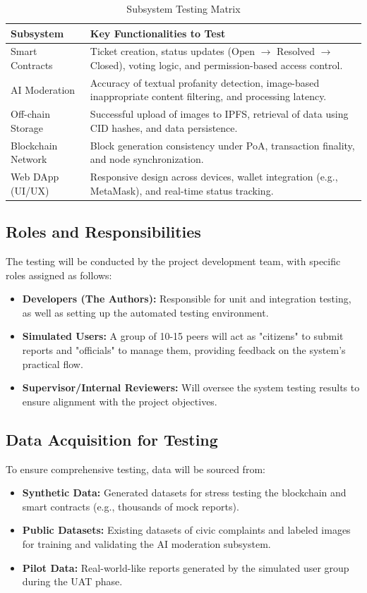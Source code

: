 \begin{table}[h!]
\centering
\caption{Subsystem Testing Matrix}
\begin{tabular}{|l|p{10cm}|}
\hline
\textbf{Subsystem} & \textbf{Key Functionalities to Test} \\ \hline
Smart Contracts & Ticket creation, status updates (Open $\rightarrow$ Resolved $\rightarrow$ Closed), voting logic, and permission-based access control. \\ \hline
AI Moderation & Accuracy of textual profanity detection, image-based inappropriate content filtering, and processing latency. \\ \hline
Off-chain Storage & Successful upload of images to IPFS, retrieval of data using CID hashes, and data persistence. \\ \hline
Blockchain Network & Block generation consistency under PoA, transaction finality, and node synchronization. \\ \hline
Web DApp (UI/UX) & Responsive design across devices, wallet integration (e.g., MetaMask), and real-time status tracking. \\ \hline
\end{tabular}
\end{table}

\subsection{Roles and Responsibilities}
The testing will be conducted by the project development team, with specific roles assigned as follows:
\begin{itemize}
    \item \textbf{Developers (The Authors):} Responsible for unit and integration testing, as well as setting up the automated testing environment.
    \item \textbf{Simulated Users:} A group of 10-15 peers will act as "citizens" to submit reports and "officials" to manage them, providing feedback on the system's practical flow.
    \item \textbf{Supervisor/Internal Reviewers:} Will oversee the system testing results to ensure alignment with the project objectives.
\end{itemize}

\subsection{Data Acquisition for Testing}
To ensure comprehensive testing, data will be sourced from:
\begin{itemize}
    \item \textbf{Synthetic Data:} Generated datasets for stress testing the blockchain and smart contracts (e.g., thousands of mock reports).
    \item \textbf{Public Datasets:} Existing datasets of civic complaints and labeled images for training and validating the AI moderation subsystem.
    \item \textbf{Pilot Data:} Real-world-like reports generated by the simulated user group during the UAT phase.
\end{itemize}

